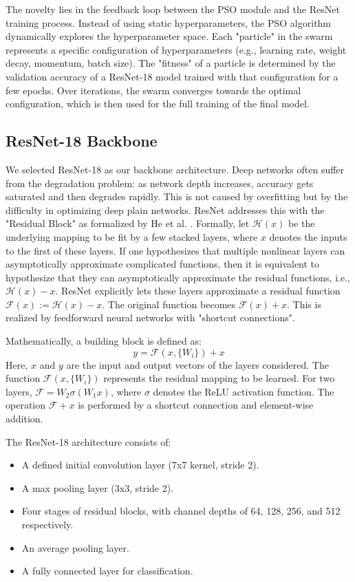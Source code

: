 \documentclass[journal]{IEEEtran}
\begin{document}
The novelty lies in the feedback loop between the PSO module and the ResNet training process. Instead of using static hyperparameters, the PSO algorithm dynamically explores the hyperparameter space. Each "particle" in the swarm represents a specific configuration of hyperparameters (e.g., learning rate, weight decay, momentum, batch size). The "fitness" of a particle is determined by the validation accuracy of a ResNet-18 model trained with that configuration for a few epochs. Over iterations, the swarm converges towards the optimal configuration, which is then used for the full training of the final model.

\subsection{ResNet-18 Backbone}
We selected ResNet-18 as our backbone architecture. Deep networks often suffer from the degradation problem: as network depth increases, accuracy gets saturated and then degrades rapidly. This is not caused by overfitting but by the difficulty in optimizing deep plain networks.
ResNet addresses this with the "Residual Block" as formalized by He et al. \cite{r4}. Formally, let $\mathcal{H}(x)$ be the underlying mapping to be fit by a few stacked layers, where $x$ denotes the inputs to the first of these layers. If one hypothesizes that multiple nonlinear layers can asymptotically approximate complicated functions, then it is equivalent to hypothesize that they can asymptotically approximate the residual functions, i.e., $\mathcal{H}(x) - x$.
ResNet explicitly lets these layers approximate a residual function $\mathcal{F}(x) := \mathcal{H}(x) - x$. The original function becomes $\mathcal{F}(x) + x$. This is realized by feedforward neural networks with "shortcut connections".

Mathematically, a building block is defined as:
\begin{equation}
y = \mathcal{F}(x, \{W_i\}) + x
\end{equation}
Here, $x$ and $y$ are the input and output vectors of the layers considered. The function $\mathcal{F}(x, \{W_i\})$ represents the residual mapping to be learned. For two layers, $\mathcal{F} = W_2 \sigma(W_1 x)$, where $\sigma$ denotes the ReLU activation function. The operation $\mathcal{F} + x$ is performed by a shortcut connection and element-wise addition.

The ResNet-18 architecture consists of:
\begin{itemize}
    \item A defined initial convolution layer (7x7 kernel, stride 2).
    \item A max pooling layer (3x3, stride 2).
    \item Four stages of residual blocks, with channel depths of 64, 128, 256, and 512 respectively.
    \item An average pooling layer.
    \item A fully connected layer for classification.
\end{itemize}
\end{document}
